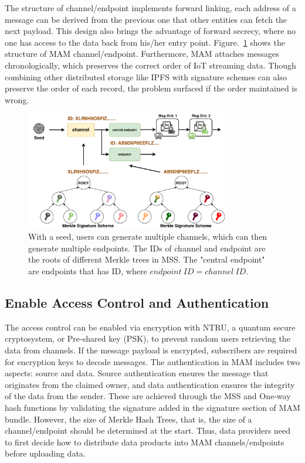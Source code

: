 \documentclass[conference]{IEEEtran}
\begin{document}
The structure of channel/endpoint implements forward linking, each address of a message can be derived from the previous one that other entities can fetch the next payload. This design also brings the advantage of forward secrecy, where no one has access to the data back from his/her entry point. Figure.~\ref{fig:mam_structure} shows the structure of MAM channel/endpoint. Furthermore, MAM attaches messages chronologically, which preserves the correct order of IoT streaming data. Though combining other distributed storage like IPFS\cite{IPFS} with signature schemes can also preserve the order of each record, the problem surfaced if the order maintained is wrong.

\begin{figure}[h]
    \centering
    \includegraphics[width=3.5in]{mam_structure}
    \caption{With a seed, users can generate multiple channels, which can then generate multiple endpoints. The IDs of channel and endpoint are the roots of different Merkle trees in MSS. The "central endpoint" are endpoints that has ID, where $endpoint\ ID = channel\ ID$.}
    \label{fig:mam_structure}
\end{figure}

\subsection{Enable Access Control and Authentication}
The access control can be enabled via encryption with NTRU\cite{NTRU}, a quantum secure cryptosystem, or Pre-shared key (PSK), to prevent random users retrieving the data from channels. If the message payload is encrypted, subscribers are required for encryption keys to decode messages. The authentication in MAM includes two aspects: source and data. Source authentication ensures the message that originates from the claimed owner, and data authentication ensures the integrity of the data from the sender. These are achieved through the MSS and One-way hash functions by validating the signature added in the signature section of MAM bundle. However, the size of Merkle Hash Trees, that is, the size of a channel/endpoint should be determined at the start. Thus, data providers need to first decide how to distribute data products into MAM channels/endpoints before uploading data. 
\end{document}
